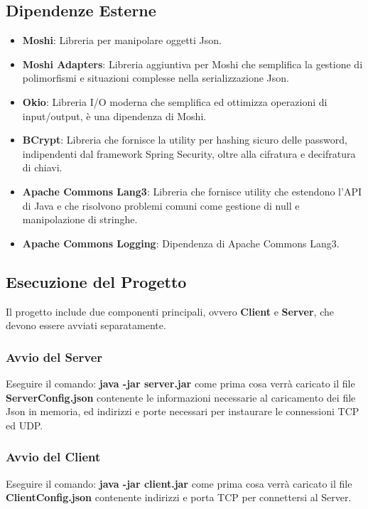 \documentclass{article}
\begin{document}
\subsection{Dipendenze Esterne}
  \begin{itemize}
    \item \textbf{Moshi}: Libreria per manipolare oggetti Json.
    \item \textbf{Moshi Adapters}: Libreria aggiuntiva per Moshi che semplifica la gestione di polimorfismi e situazioni complesse nella serializzazione Json.
    \item \textbf{Okio}: Libreria I/O moderna che semplifica ed ottimizza operazioni di input/output, è una dipendenza di Moshi.
    \item \textbf{BCrypt}: Libreria che fornisce la utility per hashing sicuro delle password, indipendenti dal framework Spring Security, oltre alla cifratura e decifratura di chiavi.
    \item \textbf{Apache Commons Lang3}: Libreria che fornisce utility che estendono l'API di Java e che risolvono problemi comuni come gestione di null e manipolazione di stringhe.
    \item \textbf{Apache Commons Logging}: Dipendenza di Apache Commons Lang3.
  \end{itemize}

\subsection{Esecuzione del Progetto}
Il progetto include due componenti principali, ovvero \textbf{Client} e \textbf{Server}, che devono essere avviati separatamente.

\subsubsection{Avvio del Server}
Eseguire il comando: \textbf{java -jar server.jar}
come prima cosa verrà caricato il file \textbf{ServerConfig.json} contenente 
le informazioni necessarie al caricamento dei file Json in memoria, ed indirizzi e porte necessari per instaurare 
le connessioni TCP ed UDP.

\subsubsection{Avvio del Client}
Eseguire il comando: \textbf{java -jar client.jar}
come prima cosa verrà caricato il file \textbf{ClientConfig.json} contenente indirizzi e porta TCP per connettersi al Server.
\end{document}
